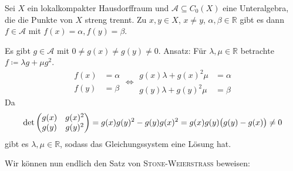 \begin{lemma}[{name=[Eigenschaft einer streng trennenden Unteralgebra]},label=lem:unteralg-streng-trennend]
	Sei $X$ ein lokalkompakter Hausdorffraum und $\mathcal{A} \subseteq C_0(X)$ eine Unteralgebra, die die Punkte von $X$ streng trennt. 
	Zu $x,y \in X$, $x \neq y$, $\alpha, \beta \in \mathbb{R}$ gibt es dann $f \in \mathcal{A}$ mit $f(x) = \alpha, f(y) = \beta$.
\end{lemma}
\begin{beweis}
	Es gibt $g \in \mathcal{A}$ mit $0 \neq g(x) \neq g(y) \neq 0$. 
	Ansatz: Für $\lambda , \mu \in \mathbb{R}$ betrachte $f \coloneqq \lambda g + \mu g^2$.
	\[
		\begin{aligned}
			f(x) &{}= \alpha \\
			f(y) &{}= \beta
		\end{aligned} 
		\iff
		\begin{aligned}
			g(x) \lambda + g(x)^2 \mu &= \alpha \\
			g(y) \lambda + g(y)^2 \mu &= \beta
		\end{aligned} 
	\]
	Da 
	\[
		\det \begin{pmatrix}
			g(x)& g(x)^2 \\
			g(y) & g(y)^2
		\end{pmatrix} = g(x) g(y)^2 - g(y) g(x)^2 = g(x)g(y) \enbrace[\big]{g(y) - g(x)} \neq 0 
	\]
	gibt es $\lambda , \mu \in \mathbb{R}$, sodass das Gleichungssystem eine Lösung hat.
\end{beweis}

Wir können nun endlich den Satz von \textsc{Stone-Weierstraß} beweisen:

